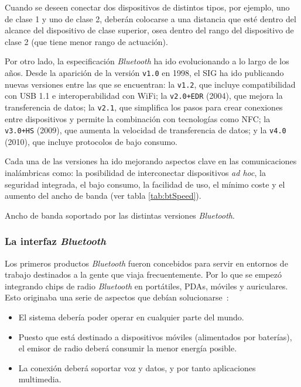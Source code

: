 Cuando se deseen conectar dos dispositivos de distintos tipos, por ejemplo,
uno de clase 1 y uno de clase 2, deberán colocarse a una distancia que esté
dentro del alcance del dispositivo de clase superior, osea dentro del
rango del dispositivo de clase 2 (que tiene menor rango de actuación).

Por otro lado, la especificación \emph{Bluetooth} ha ido evolucionando a lo
largo de los años. Desde la aparición de la versión \texttt{v1.0} en 1998,
el \acs{SIG} ha ido publicando nuevas versiones entre las que se encuentran:
la \texttt{v1.2}, que incluye compatibilidad con \acs{USB} 1.1 e 
interoperabilidad con \acs{WiFi}; la \texttt{v2.0+EDR} (2004), que mejora la 
transferencia de datos; la \texttt{v2.1}, que simplifica los pasos para crear 
conexiones entre dispositivos y permite la combinación con tecnologías como
\acs{NFC}; la \texttt{v3.0+HS} (2009), que aumenta la velocidad de
transferencia de datos; y la \texttt{v4.0} (2010), que incluye protocolos de
bajo consumo.

Cada una de las versiones ha ido mejorando aspectos clave en las comunicaciones
inalámbricas como: la posibilidad de interconectar dispositivos \emph{ad hoc},
la seguridad integrada, el bajo consumo, la facilidad de uso, el mínimo coste
y el aumento del ancho de banda (ver tabla \ref{tab:btSpeed}).

\begin{table}[H]
  \centering
  \caption[Ancho de banda soportado por las distintas versiones
  \emph{Bluetooth}.]
  {Ancho de banda soportado por las distintas versiones \emph{Bluetooth}.}
  \label{tab:btSpeed}
  {\normalsize
  
  }
\end{table}

  \subsubsection{La interfaz \emph{Bluetooth}}
Los primeros productos \emph{Bluetooth} fueron concebidos para servir en
entornos de trabajo destinados a la gente que viaja frecuentemente. Por lo
que se empezó integrando chips de radio \emph{Bluetooth} en portátiles,
\acs{PDA}s, móviles y auriculares. Esto originaba una serie de aspectos que
debían solucionarse~\cite{bib:btInterface}:
\begin{itemize}
\item El sistema debería poder operar en cualquier parte del mundo.
\item Puesto que está destinado a dispositivos móviles (alimentados por
baterías), el emisor de radio deberá consumir la menor energía posible.
\item La conexión deberá soportar voz y datos, y por tanto aplicaciones
multimedia.
\end{itemize}

